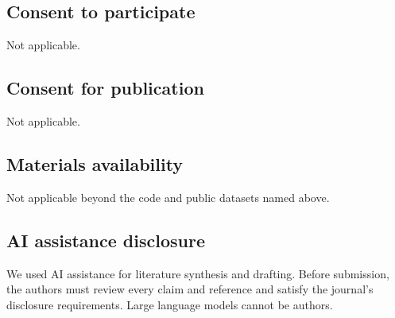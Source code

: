 \documentclass[pdflatex,sn-mathphys-num]{sn-jnl}
\begin{document}
\subsection*{Consent to participate}
Not applicable.

\subsection*{Consent for publication}
Not applicable.

\subsection*{Materials availability}
Not applicable beyond the code and public datasets named above.

\subsection*{AI assistance disclosure}
We used AI assistance for literature synthesis and drafting. Before submission, the authors must review every claim and reference and satisfy the journal's disclosure requirements. Large language models cannot be authors.
\end{document}
